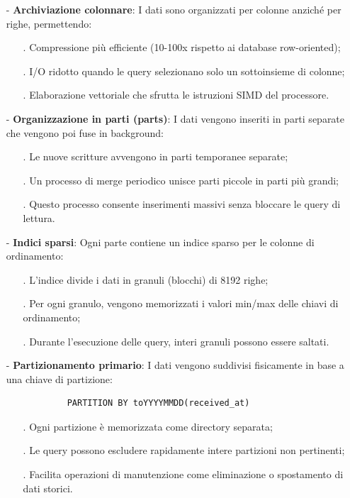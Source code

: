 \documentclass[10pt]{article}
\begin{document}
        \begin{itemize}
            \item[-] \textbf{Archiviazione colonnare}: I dati sono organizzati per colonne anziché per righe, permettendo:
            \begin{itemize}
                \item[.] Compressione più efficiente (10-100x rispetto ai database row-oriented);
                \item[.] I/O ridotto quando le query selezionano solo un sottoinsieme di colonne;
                \item[.] Elaborazione vettoriale che sfrutta le istruzioni SIMD del processore.
            \end{itemize}

            \item[-] \textbf{Organizzazione in parti (parts)}: I dati vengono inseriti in parti separate che vengono poi fuse in background:
            \begin{itemize}
                \item[.] Le nuove scritture avvengono in parti temporanee separate;
                \item[.] Un processo di merge periodico unisce parti piccole in parti più grandi;
                \item[.] Questo processo consente inserimenti massivi senza bloccare le query di lettura.
            \end{itemize}

            \item[-] \textbf{Indici sparsi}: Ogni parte contiene un indice sparso per le colonne di ordinamento:
            \begin{itemize}
                \item[.] L'indice divide i dati in granuli (blocchi) di 8192 righe;
                \item[.] Per ogni granulo, vengono memorizzati i valori min/max delle chiavi di ordinamento;
                \item[.] Durante l'esecuzione delle query, interi granuli possono essere saltati.
            \end{itemize}

            \item[-] \textbf{Partizionamento primario}: I dati vengono suddivisi fisicamente in base a una chiave di partizione:
            \begin{lstlisting}
            PARTITION BY toYYYYMMDD(received_at)
            \end{lstlisting}
            \begin{itemize}
                \item[.] Ogni partizione è memorizzata come directory separata;
                \item[.] Le query possono escludere rapidamente intere partizioni non pertinenti;
                \item[.] Facilita operazioni di manutenzione come eliminazione o spostamento di dati storici.
            \end{itemize}


\end{itemize}
\end{document}
